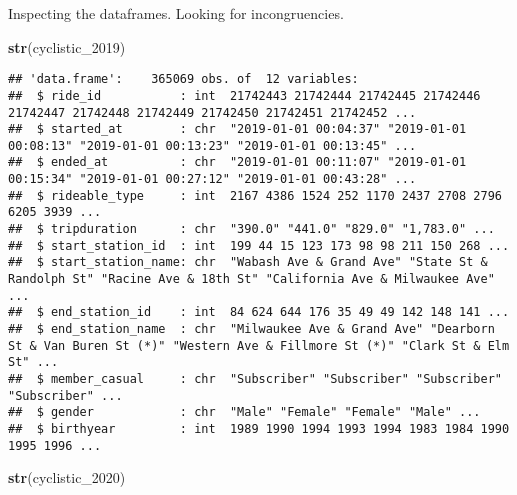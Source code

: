 \documentclass[
]{article}
\newenvironment{Shaded}{\begin{snugshade}}{\end{snugshade}}
\newcommand{\FunctionTok}[1]{\textcolor[rgb]{0.13,0.29,0.53}{\textbf{#1}}}
\newcommand{\NormalTok}[1]{#1}
\begin{document}
Inspecting the dataframes. Looking for incongruencies.

\begin{Shaded}
\begin{Highlighting}[]
\FunctionTok{str}\NormalTok{(cyclistic\_2019)}
\end{Highlighting}
\end{Shaded}

\begin{verbatim}
## 'data.frame':    365069 obs. of  12 variables:
##  $ ride_id           : int  21742443 21742444 21742445 21742446 21742447 21742448 21742449 21742450 21742451 21742452 ...
##  $ started_at        : chr  "2019-01-01 00:04:37" "2019-01-01 00:08:13" "2019-01-01 00:13:23" "2019-01-01 00:13:45" ...
##  $ ended_at          : chr  "2019-01-01 00:11:07" "2019-01-01 00:15:34" "2019-01-01 00:27:12" "2019-01-01 00:43:28" ...
##  $ rideable_type     : int  2167 4386 1524 252 1170 2437 2708 2796 6205 3939 ...
##  $ tripduration      : chr  "390.0" "441.0" "829.0" "1,783.0" ...
##  $ start_station_id  : int  199 44 15 123 173 98 98 211 150 268 ...
##  $ start_station_name: chr  "Wabash Ave & Grand Ave" "State St & Randolph St" "Racine Ave & 18th St" "California Ave & Milwaukee Ave" ...
##  $ end_station_id    : int  84 624 644 176 35 49 49 142 148 141 ...
##  $ end_station_name  : chr  "Milwaukee Ave & Grand Ave" "Dearborn St & Van Buren St (*)" "Western Ave & Fillmore St (*)" "Clark St & Elm St" ...
##  $ member_casual     : chr  "Subscriber" "Subscriber" "Subscriber" "Subscriber" ...
##  $ gender            : chr  "Male" "Female" "Female" "Male" ...
##  $ birthyear         : int  1989 1990 1994 1993 1994 1983 1984 1990 1995 1996 ...
\end{verbatim}

\begin{Shaded}
\begin{Highlighting}[]
\FunctionTok{str}\NormalTok{(cyclistic\_2020)}
\end{Highlighting}
\end{Shaded}
\end{document}
